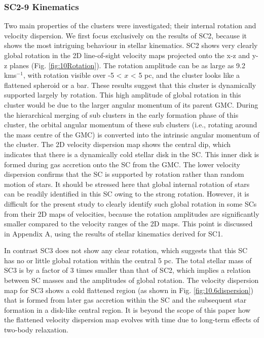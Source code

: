\documentclass[fleqn,usenatbib]{mnras}
\begin{document}
\subsubsection{SC2-9 Kinematics}
Two main properties of the clusters were investigated; their internal rotation and velocity dispersion. We first focus exclusively on the results of SC2, because it shows the most
intriguing behaviour in stellar kinematics. SC2 shows very clearly global rotation in the 2D line-of-sight velocity maps projected onto the x-z and y-z planes (Fig. \ref{fig:10Rotation}). The rotation amplitude can be as large as 9.2 kms$^{-1}$, with rotation visible over -5 < $x$ < 5 pc, and the cluster looks like a flattened spheroid or a bar. These results suggest that this cluster is dynamically supported largely by rotation. This high amplitude of global rotation in this cluster would be due to the larger angular momentum of its parent GMC. During the hierarchical merging of sub clusters in the early formation phase of this cluster, the orbital angular momentum of these sub clusters (i.e., rotating around the mass centre of the GMC) is converted into the intrinsic angular momentum of the cluster. The 2D velocity dispersion map shows the central dip, which indicates that there is a dynamically cold stellar disk in the SC. This inner disk is formed during gas accretion onto the SC from the GMC. The lower velocity dispersion confirms that the SC is supported by rotation rather than random motion of stars. It should be stressed here that global internal rotation of stars can be readily identified in this SC owing to the strong rotation. However, it is difficult for the present study to clearly identify such global rotation in some SCs from their 2D maps
of velocities, because the rotation amplitudes are significantly smaller compared to the velocity ranges of the 2D maps. This point is discussed in Appendix A, using the results of stellar kinematics derived for SC1.

In contrast SC3 does not show any clear rotation, which suggests that this SC has no or little global rotation within the central 5 pc. The total stellar mass of SC3 is by a factor of 3 times smaller than that of SC2, which implies a relation between SC masses and the amplitudes of global rotation. The velocity dispersion map for SC3 shows a cold flattened region (as shown in Fig. \ref{fig:10.6dispersion}) that is formed from later gas accretion within the SC and the subsequent star formation in a disk-like central region. It is beyond the scope of this paper how the flattened velocity dispersion map evolves with time due to long-term effects of two-body relaxation.
\end{document}

